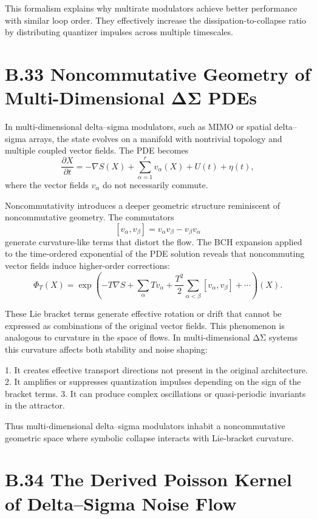This formalism explains why multirate modulators achieve better performance with similar loop order. They effectively increase the dissipation-to-collapse ratio by distributing quantizer impulses across multiple timescales.

\section{B.33 Noncommutative Geometry of Multi-Dimensional ΔΣ PDEs}

In multi-dimensional delta–sigma modulators, such as MIMO or spatial delta–sigma arrays, the state evolves on a manifold with nontrivial topology and multiple coupled vector fields. The PDE becomes
\[
\frac{\partial X}{\partial t}
= -\nabla S(X) 
+ \sum_{\alpha=1}^{r} v_{\alpha}(X)
+ U(t)
+ \eta(t),
\]
where the vector fields \(v_{\alpha}\) do not necessarily commute.

Noncommutativity introduces a deeper geometric structure reminiscent of noncommutative geometry. The commutators
\[
[v_{\alpha}, v_{\beta}] = v_{\alpha}v_{\beta} - v_{\beta}v_{\alpha}
\]
generate curvature-like terms that distort the flow. The BCH expansion applied to the time-ordered exponential of the PDE solution reveals that noncommuting vector fields induce higher-order corrections:
\[
\Phi_{T}(X) 
= \exp\!\left(-T \nabla S + \sum_{\alpha} T v_{\alpha}
+ \frac{T^{2}}{2} \sum_{\alpha<\beta} [v_{\alpha},v_{\beta}]
+ \cdots \right)(X).
\]

These Lie bracket terms generate effective rotation or drift that cannot be expressed as combinations of the original vector fields. This phenomenon is analogous to curvature in the space of flows. In multi-dimensional ΔΣ systems this curvature affects both stability and noise shaping:

1. It creates effective transport directions not present in the original architecture.  
2. It amplifies or suppresses quantization impulses depending on the sign of the bracket terms.  
3. It can produce complex oscillations or quasi-periodic invariants in the attractor.  

Thus multi-dimensional delta–sigma modulators inhabit a noncommutative geometric space where symbolic collapse interacts with Lie-bracket curvature.

\section{B.34 The Derived Poisson Kernel of Delta–Sigma Noise Flow}

